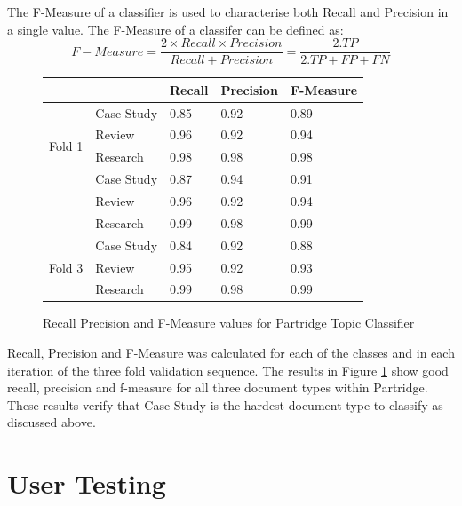 The F-Measure of a classifier is used to characterise both Recall and Precision
in a single value. The F-Measure of a classifer can be defined as:
\[
F-Measure = \frac{ 2 \times Recall \times Precision} { Recall + Precision } = 
\frac{2 . TP}{ 2 . TP + FP + FN }
\]


\begin{figure}[!th]

\centering
\begin{tabular}{| l | l | l | l | l |}
\hline
&        &\textbf{Recall}&\textbf{Precision}&\textbf{F-Measure}\\
\hline
\hline
\multirow{4}{*}{Fold 1} & Case Study & 0.85 & 0.92 & 0.89 \\
                        & Review     & 0.96 & 0.92 & 0.94 \\
                        & Research   & 0.98 & 0.98 & 0.98 \\
\hline

\multirow{4}{*}{Fold 2} & Case Study & 0.87 & 0.94 & 0.91 \\
                        & Review     & 0.96 & 0.92 & 0.94 \\
                        & Research   & 0.99 & 0.98 & 0.99 \\

\hline

\multirow{4}{*}{Fold 3} &Case Study & 0.84 & 0.92 & 0.88 \\
                        & Review    & 0.95 & 0.92 & 0.93 \\
                        & Research  & 0.99 & 0.98 & 0.99 \\


\hline


\end{tabular}

\caption{Recall Precision and F-Measure values for Partridge Topic Classifier}
\label{fig:fmeasure_table}

\end{figure}

Recall, Precision and F-Measure was calculated for each of the classes and in
each iteration of the three fold validation sequence. The results in Figure
\ref{fig:fmeasure_table} show good recall, precision and f-measure for all
three document types within Partridge. These results verify that Case Study is
the hardest document type to classify as discussed above.

\section{ User Testing } 

